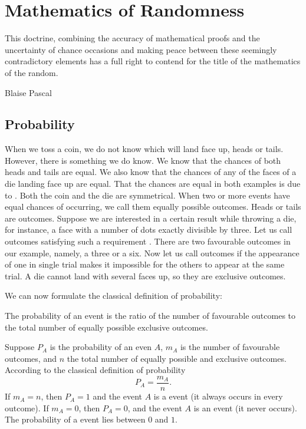 
\chapter{Mathematics of Randomness}
\epigraph{This doctrine, combining the accuracy of mathematical proofs
  and the uncertainty of chance occasions and making peace between
  these seemingly contradictory elements has a full right to contend
  for the title of the mathematics of the random.}{Blaise Pascal}

\section{Probability} 

 When
we toss a coin, we do not know which will land face up, heads or
tails. However, there is something we do know. We know that the
chances of both heads and tails are equal. We also know that the
chances of any of the faces of a die landing face up are equal. That
the chances are equal in both examples is due to . Both the
coin and the die are symmetrical. When two or more events have equal
chances of occurring, we call them equally possible outcomes. Heads or
tails are  outcomes. Suppose we are interested in a
certain result while throwing a die, for instance, a face with a
number of dots exactly divisible by three. Let us call outcomes
satisfying such a requirement . There are two favourable
outcomes in our example, namely, a three or a six. Now let us call
outcomes  if the appearance of one in single trial makes it
impossible for the others to appear at the same trial. A die cannot
land with several faces up, so they are exclusive outcomes.  

We can now formulate the classical definition of probability: 
\begin{mybox}{}
The probability of an event is the ratio of the number of favourable outcomes to the total number of equally possible exclusive outcomes.
\end{mybox}

Suppose $P_{A}$ is the probability of an even $A$, $m_{A}$ is the
number of favourable outcomes, and $n$ the total number of equally
possible and exclusive outcomes. According to the classical definition
of probability 
\begin{equation}%
P_{A} = \dfrac{m_{A}}{n}.
\label{eq-1.1}
\end{equation}
If $m_{A} =n$, then $P_{A}= 1$ and the event $A$ is a 
event (it always occurs in every outcome). If $m_{A} =0 $, then $P_{A}
=0$, and the event $A$ is an  event (it never
occurs). The probability of a  event lies between $0$ and
$1$. 

